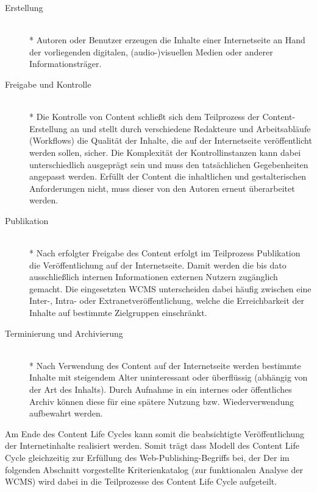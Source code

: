 \begin{description}
\item[Erstellung]\mbox{~}\\*
Autoren oder Benutzer erzeugen die Inhalte einer Internetseite an Hand der vorliegenden digitalen, (audio-)visuellen Medien oder anderer Informationsträger.
\item[Freigabe und Kontrolle]\mbox{~}\\*
Die Kontrolle von Content schließt sich dem Teilprozess der Content-Erstellung an und stellt durch verschiedene Redakteure und Arbeitsabläufe (Workflows) die Qualität der Inhalte, die auf der Internetseite veröffentlicht werden sollen, sicher. Die Komplexität der Kontrollinstanzen kann dabei unterschiedlich ausgeprägt sein und muss den tatsächlichen Gegebenheiten angepasst werden. Erfüllt der Content die inhaltlichen und gestalterischen Anforderungen nicht, muss dieser von den Autoren erneut überarbeitet werden.
\item[Publikation]\mbox{~}\\*
Nach erfolgter Freigabe des Content erfolgt im Teilprozess Publikation die Veröffentlichung auf der Internetseite. Damit werden die bis dato ausschließlich internen Informationen externen Nutzern zugänglich gemacht. Die eingesetzten WCMS unterscheiden dabei häufig zwischen eine Inter-, Intra- oder Extranetveröffentlichung, welche die Erreichbarkeit der Inhalte auf bestimmte  Zielgruppen einschränkt.
\item[Terminierung und Archivierung]\mbox{~}\\*
Nach Verwendung des Content auf der Internetseite werden bestimmte Inhalte mit steigendem Alter uninteressant oder überflüssig (abhängig von der Art des Inhalts). Durch Aufnahme in ein internes oder öffentliches Archiv können diese für eine spätere Nutzung bzw. Wiederverwendung aufbewahrt werden.
\end{description}

Am Ende des Content Life Cycles kann somit die beabsichtigte Veröffentlichung der Internetinhalte realisiert werden. Somit trägt dass Modell des Content Life Cycle gleichzeitig zur Erfüllung des Web-Publishing-Begriffs bei, der
Der im folgenden Abschnitt vorgestellte Kriterienkatalog (zur funktionalen Analyse der WCMS) wird dabei in die Teilprozesse
 des Content Life Cycle aufgeteilt.\newpage

